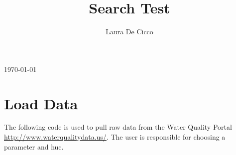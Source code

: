 \documentclass[a4paper,11pt]{article}\usepackage[]{graphicx}\usepackage[]{color}
\begin{document}
\renewenvironment{knitrout}{\begin{singlespace}}{\end{singlespace}}
\renewcommand*\listfigurename{Figures}
\renewcommand*\listtablename{Tables}






\title{Search Test}
\author[1]{Laura De Cicco}



\noindent\textsf{\today}
% 

\section{Load Data}
\label{sec:load}

The following code is used to pull raw data from the Water Quality Portal \url{http://www.waterqualitydata.us/}. The user is responsible for choosing a parameter and huc.
\end{document}
